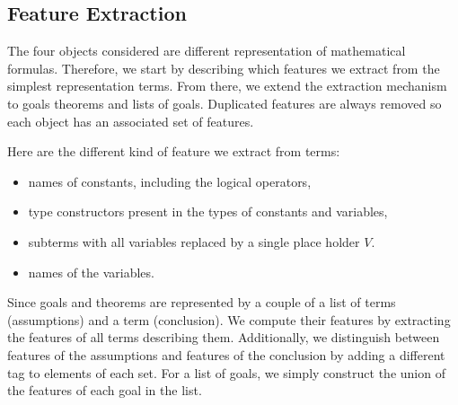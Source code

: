 \documentclass[runningheads,a4paper,draft]{svjour3}
\def\sml{\textsf{SML}\xspace}
\begin{document}

\subsection{Feature Extraction}\label{sec:features}
The four objects considered are different representation of mathematical 
formulas. Therefore, we start by describing which features we extract from the 
simplest representation terms. From there, we extend the extraction mechanism 
to goals theorems and lists of goals. Duplicated features are always removed 
so each object has an associated set of features.


Here are the different kind of feature we extract from terms:
\begin{itemize}
\item names of constants, including the logical operators,
\item type constructors present in the types of constants and variables,
\item subterms with all variables replaced by a single place holder $V$.
\item names of the variables.
\end{itemize}

Since goals and theorems are represented by a couple of a list of terms 
(assumptions) and a term (conclusion). We compute their features by extracting 
the features of all terms describing them. Additionally, we distinguish between 
features of the assumptions and features of the conclusion by adding a 
different tag to elements of each set. For a list of goals, we simply construct 
the union of the features of each goal 
in the list. 




\end{document}
